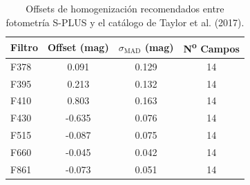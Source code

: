 \begin{table}
\centering
\caption{Offsets de homogenización recomendados entre fotometría S-PLUS y el catálogo de Taylor et al. (2017).}
\label{tab:offsets}
\begin{tabular}{lccc}
\hline
Filtro & Offset (mag) & $\sigma_{\mathrm{MAD}}$ (mag) & N\textsuperscript{o} Campos \\
\hline
F378 & 0.091 & 0.129 & 14 \\
F395 & 0.213 & 0.132 & 14 \\
F410 & 0.803 & 0.163 & 14 \\
F430 & -0.635 & 0.076 & 14 \\
F515 & -0.087 & 0.075 & 14 \\
F660 & -0.045 & 0.042 & 14 \\
F861 & -0.073 & 0.051 & 14 \\
\hline
\end{tabular}
\end{table}
